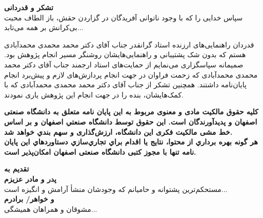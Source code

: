 \thispagestyle{empty}
\vspace*{1.5cm}

{\large
	\textbf{تشکر و قدردانی}\\
	
	
	سپاس خدایی را که با وجود ناتوانی آفریدگان در گزاردن حقش، باز الطاف محبت بی‌کرانش بر همه می‌تابد...
	
	قدردان راهنمایی‌های ارزنده استاد گرانقدر جناب آقای دکتر محمد محمدی محمدآبادی هستم که بدون شک پشتیبانی و راهنمایی‌هایشان روشنگر مسیر انجام پژوهش بود. صمیمانه سپاسگزاری می‌نمایم از حمایت‌های استاد ارجمند جناب آقای دکتر محمد محمدی محمدآبادی که زحمت فراوان در جهت انجام پردازش‌های لازم و پیش‌برد انجام پایان‌نامه داشتند. همچنین تشکر از جناب آقای دکتر محمد محمدی محمدآبادی که با کمک‌هایشان، بنده را در جهت انجام این پژوهش یاری نمودند.
	
}
\restoregeometry
\pagebreak

%
%		
%		

\thispagestyle{empty}

\vspace*{3cm}
\textbf{\Large کلیه حقوق مالکیت مادی و معنوی مربوط به اين پايان نامه متعلق به دانشگاه صنعتی اصفهان و پدیدآورندگان است. این حقوق توسط دانشگاه صنعتي اصفهان و بر اساس خط مشی مالکیت فکری این دانشگاه، ارزش‌گذاری و سهم بندي خواهد شد.
\\
			هر گونه بهره برداري از محتوا، نتايج یا اقدام براي تجاري‌سازي دستاوردهاي اين پايان نامه تنها با مجوز کتبی دانشگاه صنعتی اصفهان امکان‌پذیر است.
}

\restoregeometry
\pagebreak

\thispagestyle{empty}
\vspace*{3cm}

{\nastaliq
	\Huge
	\raggedleft
	\textbf{\vspace{2cm}تقدیم به}	
	\\
\hspace{1cm}	
\textbf{\vspace{0.5cm}پدر و مادر عزیزم}
\\
\hspace{4cm}
	مستحکم‌ترین پشتوانه و حامیانم که وجودشان منشأ آرامش و انگیزه است...\vspace{1cm}
\\ 
\hspace{1cm}	
\textbf{\vspace{0.5cm}و خواهر/ برادرم}
\\
\hspace{4cm}
	مشوقان و همراهان همیشگی...
	
	
}
\pagebreak

